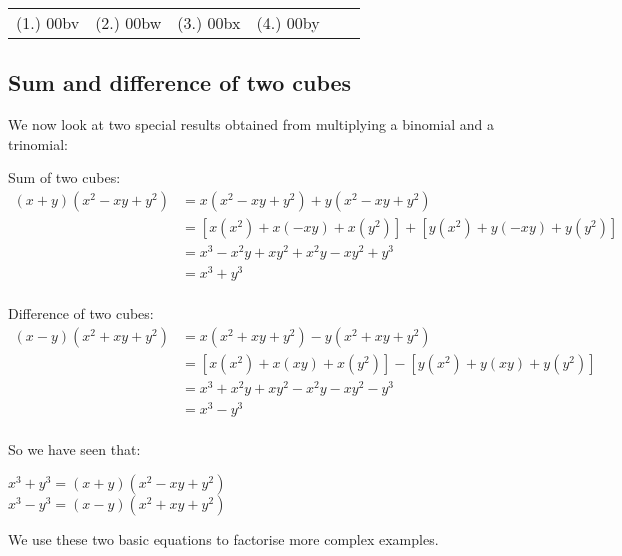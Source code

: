 \begin{exercises}{}
{\begin{enumerate}[itemsep=5pt, label=\textbf{\arabic*}. ]
\end{enumerate}
\practiceinfo 
\par 
 \par \begin{tabular}[h]{cccccc}
 (1.) 00bv&  (2.) 00bw&  (3.) 00bx&  (4.) 00by& \end{tabular}
}
\end{exercises} 

\subsection*{Sum and difference of two cubes}      
We now look at two special results obtained from multiplying a binomial and a trinomial: \\
\par
Sum of two cubes:
\begin{align*}
  (x+y)({x}^{2}-xy+{y}^{2}) &= x({x}^{2}-xy+{y}^{2})+y({x}^{2}- xy+{y}^{2})\\
  &= \left[x({x}^{2})+x(-xy)+x({y}^{2})\right]+\left[y({x}^{2})+y(-xy)+y({y}^{2})\right]\\
  &= {x}^{3}-{x}^{2}y+x{y}^{2}+{x}^{2}y-x{y}^{2}+{y}^{3} \\
  &= {x}^{3}+{y}^{3}\\
\end{align*}

\par
Difference of two cubes:
\begin{align*}
(x-y)({x}^{2}+xy+{y}^{2}) &= x({x}^{2}+xy+{y}^{2})-y({x}^{2}+ xy+{y}^{2})\\
  &= \left[x({x}^{2})+x(xy)+x({y}^{2})\right]-\left[y({x}^{2})+y(xy)+y({y}^{2})\right]\\
  &= {x}^{3}+{x}^{2}y+x{y}^{2}-{x}^{2}y-x{y}^{2}-{y}^{3} \\
  &= {x}^{3}-{y}^{3}\\
\end{align*}

So we have seen that:
\begin{center}
${x}^{3}+{y}^{3}=(x+y)({x}^{2}-xy+{y}^{2})$\\
${x}^{3}-{y}^{3}=(x-y)({x}^{2}+xy+{y}^{2})$\\
\end{center}
\par
We use these two basic equations to factorise more complex examples.


